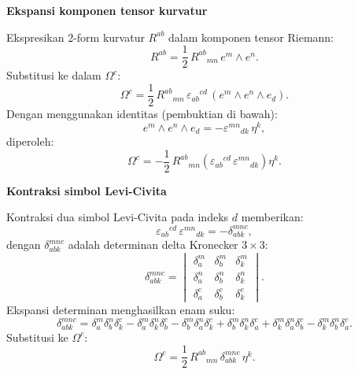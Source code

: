 \vspace{0.5em}
\noindent \textbf{Ekspansi komponen tensor kurvatur}

Ekspresikan 2-form kurvatur $R^{ab}$ dalam komponen tensor Riemann:
\begin{equation}
    R^{ab} = \frac{1}{2}\, R^{ab}{}_{mn}\, e^m \wedge e^n.
\end{equation}
Substitusi ke dalam $\Omega^c$:
\begin{equation}
    \Omega^c = \frac{1}{2}\, R^{ab}{}_{mn}\, \varepsilon_{ab}{}^{cd}\, (e^m \wedge e^n \wedge e_d).
\end{equation}
Dengan menggunakan identitas (pembuktian di bawah):
\begin{equation}\label{eq:3form-dual}
    e^m \wedge e^n \wedge e_d = -\varepsilon^{mn}{}_{dk}\, \eta^k,
\end{equation}
diperoleh:
\begin{equation}
    \Omega^c = -\frac{1}{2}\, R^{ab}{}_{mn}\left(\varepsilon_{ab}{}^{cd}\, \varepsilon^{mn}{}_{dk}\right) \eta^k.
\end{equation}

\vspace{0.5em}
\noindent \textbf{Kontraksi simbol Levi-Civita}

Kontraksi dua simbol Levi-Civita pada indeks $d$ memberikan:
\begin{equation}
    \varepsilon_{ab}{}^{cd}\, \varepsilon^{mn}{}_{dk} = -\delta^{mnc}_{abk},
\end{equation}
dengan $\delta^{mnc}_{abk}$ adalah determinan delta Kronecker $3 \times 3$:
\begin{equation}
    \delta^{mnc}_{abk} =
    \begin{vmatrix}
    \delta^m_a & \delta^m_b & \delta^m_k \\
    \delta^n_a & \delta^n_b & \delta^n_k \\
    \delta^c_a & \delta^c_b & \delta^c_k
    \end{vmatrix}.
\end{equation}
Ekspansi determinan menghasilkan enam suku:
\begin{equation}
    \delta^{mnc}_{abk} = \delta^m_a \delta^n_b \delta^c_k - \delta^m_a \delta^n_k \delta^c_b - \delta^m_b \delta^n_a \delta^c_k + \delta^m_b \delta^n_k \delta^c_a + \delta^m_k \delta^n_a \delta^c_b - \delta^m_k \delta^n_b \delta^c_a.
\end{equation}
Substitusi ke $\Omega^c$:
\begin{equation}
    \Omega^c = \frac{1}{2}\, R^{ab}{}_{mn}\, \delta^{mnc}_{abk}\, \eta^k.
\end{equation}

